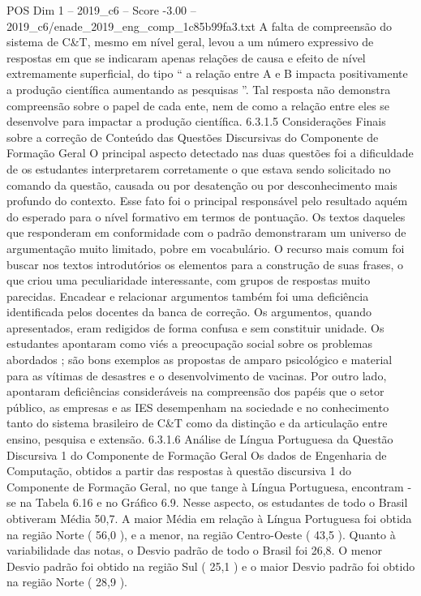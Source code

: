 \begin{textsample}{POS Dim 1 – 2019\_c6 – Score -3.00 – 2019\_c6/enade\_2019\_eng\_comp\_1c85b99fa3.txt}
A falta de compreensão do sistema de C\&T, mesmo em nível geral, levou a um número expressivo de respostas em que se indicaram apenas relações de causa e efeito de nível extremamente superficial, do tipo “ a relação entre A e B impacta positivamente a produção científica aumentando as pesquisas ”.
Tal resposta não demonstra compreensão sobre o papel de cada ente, nem de como a relação entre eles se desenvolve para impactar a produção científica. 6.3.1.5 Considerações Finais sobre a correção de Conteúdo das Questões Discursivas do Componente de Formação Geral O principal aspecto detectado nas duas questões foi a dificuldade de os estudantes interpretarem corretamente o que estava sendo solicitado no comando da questão, causada ou por desatenção ou por desconhecimento mais profundo do contexto.
Esse fato foi o principal responsável pelo resultado aquém do esperado para o nível formativo em termos de pontuação.
Os textos daqueles que responderam em conformidade com o padrão demonstraram um universo de argumentação muito limitado, pobre em vocabulário.
O recurso mais comum foi buscar nos textos introdutórios os elementos para a construção de suas frases, o que criou uma peculiaridade interessante, com grupos de respostas muito parecidas.
Encadear e relacionar argumentos também foi uma deficiência identificada pelos docentes da banca de correção.
Os argumentos, quando apresentados, eram redigidos de forma confusa e sem constituir unidade.
Os estudantes apontaram como viés a preocupação social sobre os problemas abordados ; são bons exemplos as propostas de amparo psicológico e material para as vítimas de desastres e o desenvolvimento de vacinas.
Por outro lado, apontaram deficiências consideráveis na compreensão dos papéis que o setor público, as empresas e as IES desempenham na sociedade e no conhecimento tanto do sistema brasileiro de C\&T como da distinção e da articulação entre ensino, pesquisa e extensão. 6.3.1.6 Análise de Língua Portuguesa da Questão Discursiva 1 do Componente de Formação Geral Os dados de Engenharia de Computação, obtidos a partir das respostas à questão discursiva 1 do Componente de Formação Geral, no que tange à Língua Portuguesa, encontram -se na Tabela 6.16 e no Gráfico 6.9.
Nesse aspecto, os estudantes de todo o Brasil obtiveram Média 50,7.
A maior Média em relação à Língua Portuguesa foi obtida na região Norte ( 56,0 ), e a menor, na região Centro-Oeste ( 43,5 ).
Quanto à variabilidade das notas, o Desvio padrão de todo o Brasil foi 26,8.
O menor Desvio padrão foi obtido na região Sul ( 25,1 ) e o maior Desvio padrão foi obtido na região Norte ( 28,9 ).

\end{textsample}
